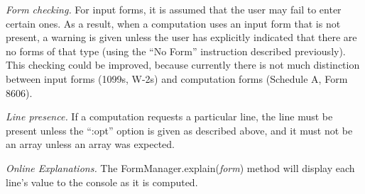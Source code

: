 \emph{Form checking.} For input forms, it is assumed that the user may fail to
enter certain ones. As a result, when a computation uses an input form that is
not present, a warning is given unless the user has explicitly indicated that
there are no forms of that type (using the ``No Form'' instruction described
previously). This checking could be improved, because currently there is not
much distinction between input forms (1099s, W-2s) and computation forms
(Schedule A, Form 8606).

\emph{Line presence.} If a computation requests a particular line, the line must
be present unless the ``:opt'' option is given as described above, and it must
not be an array unless an array was expected.


\emph{Online Explanations.} The FormManager.explain(\emph{form}) method will
display each line's value to the console as it is computed. 

